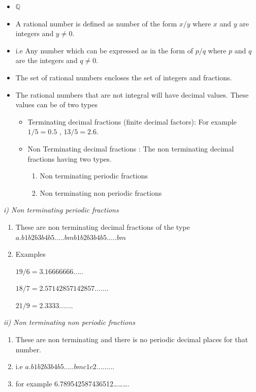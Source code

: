 \documentclass[]{book}
\providecommand{\tightlist}{%
  \setlength{\itemsep}{0pt}\setlength{\parskip}{0pt}}
\begin{document}
\begin{itemize}
\item
  \(\mathbb{Q}\)
\item
  A rational number is defined as number of the form \(x/y\) where \(x\) and \(y\) are integers and \(y \neq 0\).
\item
  i.e Any number which can be expressed as in the form of \(p/q\) where \(p\) and \(q\) are the integers and \(q \neq 0\).
\item
  The set of rational numbers encloses the set of integers and fractions.
\item
  The rational numbers that are not integral will have decimal values. These values can be of two types

  \begin{itemize}
  \tightlist
  \item
    Terminating decimal fractions (finite decimal factors): For example \(1/5 = 0.5\) , \(13/5 = 2.6\).
  \item
    Non Terminating decimal fractions : The non terminating decimal fractions having two types.

    \begin{enumerate}
    \def\labelenumi{\roman{enumi})}
    \tightlist
    \item
      Non terminating periodic fractions
    \item
      Non terminating non periodic fractions
    \end{enumerate}
  \end{itemize}
\end{itemize}

\emph{i) Non terminating periodic fractions}

\begin{enumerate}
\def\labelenumi{\alph{enumi}.}
\item
  These are non terminating decimal fractions of the type \(a.b1b2b3b4b5 .....bmb1b2b3b4b5 .....bm\)
\item
  Examples

  \(19/6 = 3.16666666.....\)

  \(18/7 = 2.57142857142857.......\)

  \(21/9= 2.3333.......\)
\end{enumerate}

\emph{ii) Non terminating non periodic fractions}

\begin{enumerate}
\def\labelenumi{\alph{enumi}.}
\tightlist
\item
  These are non terminating and there is no periodic decimal places for that number.
\item
  i.e \(a.b1b2b3b4b5 .....bmc1c2.........\)
\item
  for example 6.789542587436512\ldots{}\ldots{}\ldots{}.
\end{enumerate}
\end{document}
